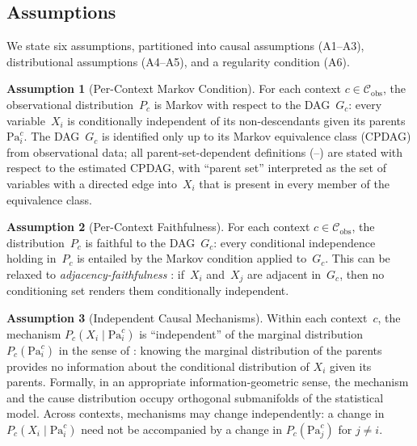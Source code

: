 \documentclass[11pt,a4paper]{article}
\theoremstyle{definition}
\newtheorem{assumption}{Assumption}
\newcommand{\cC}{\mathcal{C}}                 %
\newcommand{\Pa}{\mathrm{Pa}}                 %
\newcommand{\Cobs}{\cC_{\mathrm{obs}}}        %
\begin{document}
\subsection{Assumptions}\label{sec:assumptions}

We state six assumptions, partitioned into causal assumptions (A1--A3),
distributional assumptions (A4--A5), and a regularity condition (A6).

\begin{assumption}[Per-Context Markov Condition]\label{ass:markov}
For each context $c \in \Cobs$, the observational distribution~$P_c$ is
Markov with respect to the DAG~$G_c$: every variable~$X_i$ is
conditionally independent of its non-descendants given its parents
$\Pa_i^c$.  The DAG~$G_c$ is identified only up to its Markov equivalence
class (CPDAG) from observational data; all parent-set-dependent definitions
(--) are stated with
respect to the estimated CPDAG, with ``parent set'' interpreted as the set
of variables with a directed edge into~$X_i$ that is present in every
member of the equivalence class.
\end{assumption}

\begin{assumption}[Per-Context Faithfulness]\label{ass:faithfulness}
For each context $c \in \Cobs$, the distribution~$P_c$ is faithful to the
DAG~$G_c$: every conditional independence holding in~$P_c$ is entailed by
the Markov condition applied to~$G_c$.  This can be relaxed to
\emph{adjacency-faithfulness} \citep{ramsey2006adjacency}: if~$X_i$
and~$X_j$ are adjacent in~$G_c$, then no conditioning set renders them
conditionally independent.
\end{assumption}

\begin{assumption}[Independent Causal Mechanisms]\label{ass:icm}
Within each context~$c$, the mechanism $P_c(X_i \mid \Pa_i^c)$ is
``independent'' of the marginal distribution $P_c(\Pa_i^c)$ in the sense
of \citet{scholkopf2012causal}: knowing the marginal distribution of the
parents provides no information about the conditional distribution of
$X_i$ given its parents.  Formally, in an appropriate
information-geometric sense, the mechanism and the cause distribution
occupy orthogonal submanifolds of the statistical model.  Across contexts,
mechanisms may change independently: a change in $P_c(X_i \mid \Pa_i^c)$
need not be accompanied by a change in $P_c(\Pa_j^c)$ for $j \ne i$.
\end{assumption}
\end{document}
